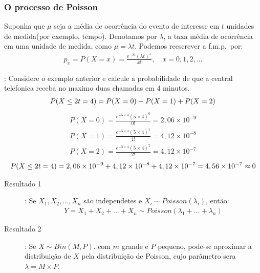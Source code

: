      \subsubsection{O processo de Poisson}
     \begin{description}  
       \item     Suponha que $\mu$ seja a média de ocorrência do evento de interesse
     em $t$ unidades de medida(por exemplo, tempo). Denotamos por $\lambda$,
     a taxa média de ocorrência em uma unidade de medida, como $\mu= \lambda t$.
     Podemos reescrever a f.m.p.\ por:
     \begin{align*}
       p_{x} =P(X=x)= \frac{e^{-\lambda t} \left( \lambda t \right)^{x}}{x!}, \quad x=0,1,2,\ldots
     \end{align*}
       \item[Exemplo]: Considere o exemplo anterior e calcule a probabilidade de que a central 
         telefonica receba no maximo duas chamadas em 4 minutos.
         \begin{align*}
           P(X \leq 2 \/ t=4) = P(X=0)+P(X=1)+P(X=2)
         \end{align*}
     \begin{align*}
       P(X=0) = \frac{e^{-5 \times 4}(5\times 4)^0}{0!}= 2,06 \times 10^{-9}\\
       P(X=1) = \frac{e^{-5 \times 4}(5\times 4)^1}{1!}= 4,12 \times 10^{-8}\\
       P(X=2) = \frac{e^{-5 \times 4}(5\times 4)^2}{2!}= 4,12 \times 10^{-7} 
     \end{align*}
    \begin{align*}
      P(X \leq 2 \/ t=4)= 2,06 \times 10^{-9}+4,12 \times 10^{-8}+4,12 \times 10^{-7} = 4,56 \times 10^{-7} \approx 0
    \end{align*} 
  \item[Resultados Importantes]
    \begin{description}
  \item [Resultado 1]: Se $X_1, X_2,\ldots, X_n$ são independetes e $X_i \mathtt{\sim} Poisson(\lambda_i)$, então:
    \begin{align}
      Y= X_1+X_2+\ldots+X_n \mathtt{\sim} Poisson\left( \lambda_1+\ldots+\lambda_n \right)
    \end{align}
  \item [Resultado 2]: Se $X \mathtt{\sim}Bin(M,P)$. com $m$ grande e $P$ pequeno, pode-se aproximar a distribuição de 
    $X$ pela distribuição de Poisson, cujo parâmetro sera $\lambda = M \times P$.
\end{description}


\end{description}
